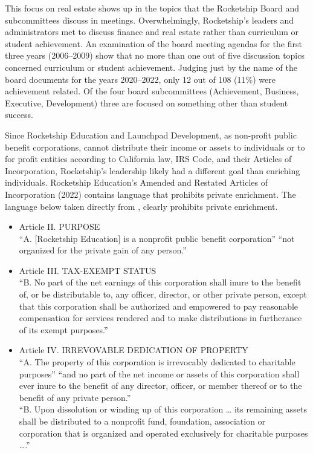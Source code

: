This focus on real estate shows up in the topics that the Rocketship Board and subcommittees discuss in meetings. Overwhelmingly, Rocketship's leaders and administrators met to discuss finance and real estate rather than curriculum or student achievement. An examination of the board meeting agendas for the first three years (2006–2009) show that no more than one out of five discussion topics concerned curriculum or student achievement. Judging just by the name of the board documents for the years 2020–2022, only 12 out of 108 (11\%) were achievement related. Of the four board subcommittees (Achievement, Business, Executive, Development) three are focused on something other than student success.

Since Rocketship Education and Launchpad Development, as non-profit public benefit corporations, cannot distribute their income or assets to individuals or to for profit entities according to California law, IRS Code, and their Articles of Incorporation, Rocketship's leadership  likely had a different goal than enriching individuals. Rocketship Education's Amended and Restated Articles of Incorporation (2022) contains language that prohibits private enrichment. The language below taken directly from \textcite{RSED2022}, clearly prohibits private enrichment.
\begin{itemize}
  \item Article II. PURPOSE\\\noindent ``A. [Rocketship Education] is a nonprofit public benefit corporation'' ``not organized for the private gain of any person.''
  \item Article III. TAX-EXEMPT STATUS\\\noindent ``B. No part of the net earnings of this corporation shall inure to the benefit of, or be distributable to, any officer, director, or other private person, except that this corporation shall be authorized and empowered to pay reasonable compensation for services rendered and to make distributions in furtherance of its exempt purposes.''
  \item Article IV. IRREVOVABLE DEDICATION OF PROPERTY\\\noindent ``A. The property of this corporation is irrevocably dedicated to charitable purposes'' ``and no part of the net income or assets of this corporation shall ever inure to the benefit of any director, officer, or member thereof or to the benefit of any private person.''\\\noindent
  ``B. Upon dissolution or winding up of this corporation … its remaining assets shall be distributed to a nonprofit fund, foundation, association or corporation that is organized and operated exclusively for charitable purposes ….''
\end{itemize}

